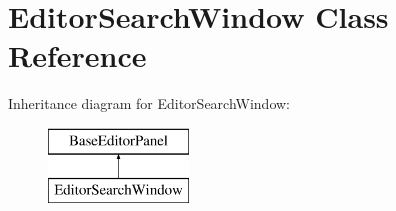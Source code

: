 \hypertarget{class_editor_search_window}{}\section{Editor\+Search\+Window Class Reference}
\label{class_editor_search_window}
Inheritance diagram for Editor\+Search\+Window\+:\begin{figure}[H]
\begin{center}
\leavevmode
\includegraphics[height=2.000000cm]{class_editor_search_window}
\end{center}
\end{figure}

